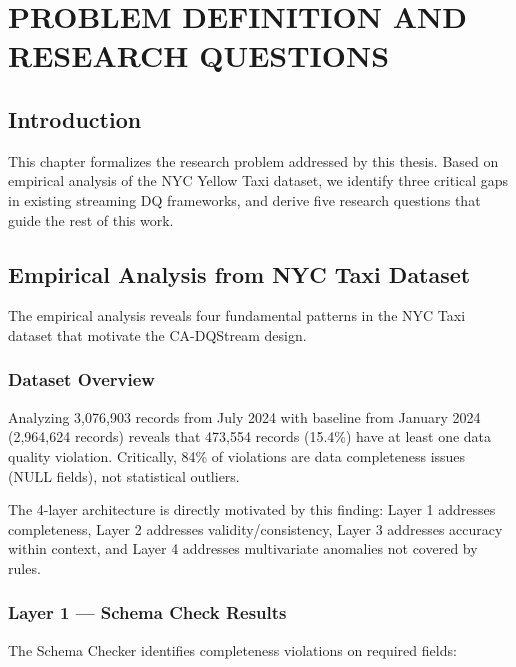 \newpage
\chapter{PROBLEM DEFINITION AND RESEARCH QUESTIONS}
\pagestyle{fancy}

\section{Introduction}

This chapter formalizes the research problem addressed by this thesis. Based on empirical analysis of the NYC Yellow Taxi dataset, we identify three critical gaps in existing streaming DQ frameworks, and derive five research questions that guide the rest of this work.

\section{Empirical Analysis from NYC Taxi Dataset}

The empirical analysis reveals four fundamental patterns in the NYC Taxi dataset that motivate the CA-DQStream design.

\subsection{Dataset Overview}

Analyzing 3,076,903 records from July 2024 with baseline from January 2024 (2,964,624 records) reveals that 473,554 records (15.4\%) have at least one data quality violation. Critically, 84\% of violations are data completeness issues (NULL fields), not statistical outliers.

The 4-layer architecture is directly motivated by this finding: Layer 1 addresses completeness, Layer 2 addresses validity/consistency, Layer 3 addresses accuracy within context, and Layer 4 addresses multivariate anomalies not covered by rules.

\subsection{Layer 1 --- Schema Check Results}

The Schema Checker identifies completeness violations on required fields:

